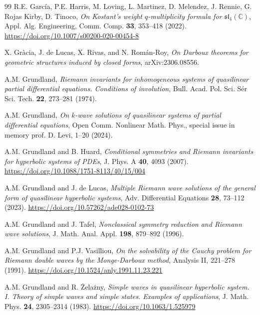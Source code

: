 \documentclass[12pt]{article}
\theoremstyle{plain}
\theoremstyle{definition}
\numberwithin{equation}{section}
\begin{document}
\begin{thebibliography}{99}
R.E. Garc\'ia, P.E. Harris, M. Loving, L. Martinez, D. Melendez, J. Rennie, G. Rojas Kirby, D. Tinoco,
{\it On Kostant’s weight $q$-multiplicity formula for $\mathfrak{sl}_4(\mathbb{C})$}, Appl. Alg. Engineering, Comm.  Comp. {\bf 33}, 353--418 (2022). \url{https://doi.org/10.1007/s00200-020-00454-8}

X. Gràcia, J. de Lucas, X. Rivas, and  N. Román-Roy, {\it 
On Darboux theorems for geometric structures induced by closed forms}, 
arXiv:2306.08556.

A.M. Grundland, {\it Riemann invariants for inhomogeneous systems of quasilinear partial differential equations. Conditions of involution}, Bull. Acad. Pol. Sci. S\'er Sci. Tech. {\bf 22}, 273--281 (1974).

A.M. Grundland, {\it On $k$-wave solutions of quasilinear systems of partial differential equations}, Open Comm. Nonlinear Math. Phys., special issue in memory prof. D. Levi, 1--20 (2024). 

A.M. Grundland and B. Huard, {\it Conditional symmetries and Riemann invariants for hyperbolic systems of PDEs}, J. Phys. A {\bf 40}, 4093 (2007). \url{https://doi.org/10.1088/1751-8113/40/15/004}

 A.M. Grundland and J. de Lucas,
{\it Multiple Riemann wave solutions of the general form of quasilinear hyperbolic systems}, 
Adv. Differential Equations {\bf 28}, 73--112 (2023). 
\url{https://doi.org/10.57262/ade028-0102-73}

A.M. Grundland and J. Tafel, {\it Nonclassical symmetry reduction and Riemann wave solutions}, J. Math. Anal. Appl. {\bf 198}, 879--892 (1996).

A.M. Grundland and P.J. Vasilliou, {\it On the solvability of the Cauchy problem for Riemann double waves by the Monge-Darboux method}, Analysis II, 221--278 (1991). \url{https://doi.org/10.1524/anly.1991.11.23.221}



A.M. Grundland and R. \.Zela\.zny, {\sl Simple waves in quasilinear hyperbolic system. I. Theory of simple waves and simple states. Examples of applications}, J. Math. Phys. {\bf 24}, 2305--2314 (1983). \url{https://doi.org/10.1063/1.525979}


\end{thebibliography}
\end{document}
